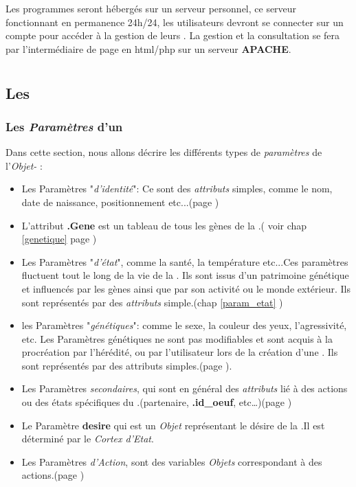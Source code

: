 \documentclass[french]{report}
\begin{document}
Les programmes seront hébergés sur un serveur personnel, ce serveur fonctionnant en permanence 24h/24, les utilisateurs devront se connecter sur un compte pour accéder à la gestion de leurs \CoCiX. La gestion et la consultation se fera par l'intermédiaire de page en html/php sur un serveur \textbf{APACHE}.

\part{\CoCiX}

\chapter{Les \CoCiX}
\section{Les \textit{Paramètres} d'un \CoCiX}\label{parametre}
Dans cette section, nous allons décrire les différents types de \textit{paramètres} de l'\textit{Objet-\CoCiX} :\\


\begin{itemize}
\item Les Paramètres "\textit{d'identité}": Ce sont des \textit{attributs} simples, comme le nom, date de naissance, positionnement etc...(page \pageref{identite})
\item L'attribut \textbf{.Gene} est un tableau de tous les gènes de la \CoCiX.( voir chap \ref{genetique} page \pageref{genome})

\item Les Paramètres "\textit{d'état}", comme la santé, la température etc...Ces paramètres fluctuent tout le long de la vie de la \CoCiX. Ils sont issus d'un patrimoine génétique et influencés par les gènes ainsi que par son activité ou le monde extérieur. Ils sont représentés par des  \textit{attributs} simple.(chap \ref{param_etat} \pageref{param_etat})

\item les Paramètres "\textit{génétiques}": comme le sexe, la couleur des yeux, l'agressivité, etc. Les Paramètres génétiques ne sont pas modifiables et sont acquis à la procréation par l'hérédité, ou par l'utilisateur lors de la création d'une \CoCiX. Ils sont représentés par des attributs simples.(page \pageref{genetique}).


\item Les Paramètres \textit{secondaires}, qui sont en général des \textit{attributs} lié à des actions ou des états spécifiques du \CoCiX.(partenaire, \textbf{.id\_oeuf}, etc\dots)(page \pageref{param_second})

\item Le Paramètre \textbf{desire} qui est un \textit{Objet} représentant le désire de la \CoCiX.Il est déterminé par le \textit{Cortex d'Etat}.

\item Les Paramètres \textit{d'Action}, sont des variables \textit{Objets} correspondant à des actions.(page \pageref{param_action})\\
\end{itemize}
\end{document}
